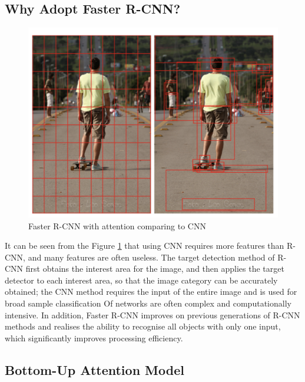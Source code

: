
\subsection{Why Adopt Faster R-CNN?}

\begin{figure}[h!]
\centering
\includegraphics[width=.5\textwidth]{whyfasterrcnn.pdf}
\caption{Faster R-CNN with attention comparing to CNN \cite{bottomup}}
\label{fig:fasterrcnnbottomup}
\end{figure}

It can be seen from the Figure \ref{fig:fasterrcnnbottomup} that using CNN requires more features than R-CNN, and many features are often useless. The target detection method of R-CNN first obtains the interest area for the image, and then applies the target detector to each interest area, so that the image category can be accurately obtained; the CNN method requires the input of the entire image and is used for broad sample classification Of networks are often complex and computationally intensive. In addition, Faster R-CNN improves on previous generations of R-CNN methods and realises the ability to recognise all objects with only one input, which significantly improves processing efficiency.

\subsection{Bottom-Up Attention Model}

